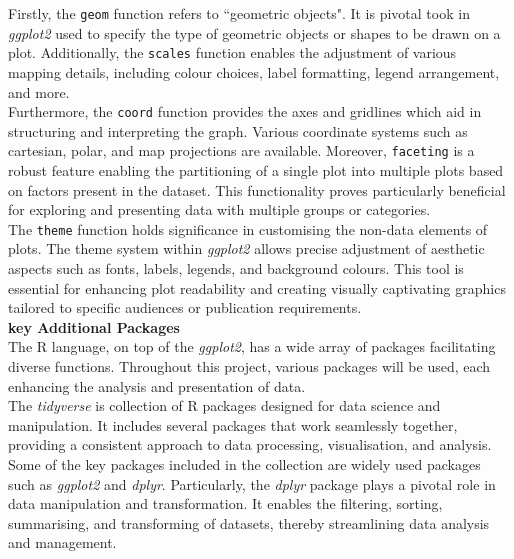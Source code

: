 \documentclass{article}\usepackage[]{graphicx}\usepackage[]{xcolor}
\numberwithin{equation}{section}
\begin{document}
\noindent
Firstly, the \texttt{geom} function refers to ``geometric objects". It is pivotal took in \textit{ggplot2} used to specify the type of geometric objects or shapes to be drawn on a plot. Additionally, the \texttt{scales} function enables the adjustment of various mapping details, including colour choices, label formatting, legend arrangement, and more.\\

\noindent Furthermore, the \texttt{coord} function provides the axes and gridlines which aid in structuring and interpreting the graph. Various coordinate systems such as cartesian, polar, and map projections are available. Moreover, \texttt{faceting} is a robust feature enabling the partitioning of a single plot into multiple plots based on factors present in the dataset. This functionality proves particularly beneficial for exploring and presenting data with multiple groups or categories.\\

\noindent The \texttt{theme} function holds significance in customising the non-data elements of plots. The theme system within \textit{ggplot2} allows precise adjustment of aesthetic aspects such as fonts, labels, legends, and background colours. This tool is essential for enhancing plot readability and creating visually captivating graphics tailored to specific audiences or publication requirements.\\

\noindent \textbf{key Additional Packages}\\

\noindent The R language, on top of the \textit{ggplot2}, has a wide array of packages facilitating diverse functions. Throughout this project, various packages will be used, each enhancing the analysis and presentation of data.\\

\noindent The \textit{tidyverse} is  collection of R packages designed for data science and manipulation. It includes several packages that work seamlessly together, providing a consistent approach to data processing, visualisation, and analysis.\\

\noindent Some of the key packages included in the collection are widely used packages such as \textit{ggplot2} and \textit{dplyr}. Particularly, the \textit{dplyr} package plays a pivotal role in data manipulation and transformation. It enables the filtering, sorting, summarising, and transforming of datasets, thereby streamlining data analysis and management.\\
\end{document}
